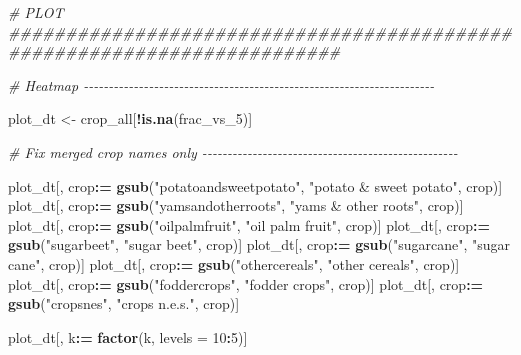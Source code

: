 \documentclass[
  11pt,
]{article}
\newenvironment{Shaded}{\begin{snugshade}}{\end{snugshade}}
\newcommand{\AttributeTok}[1]{\textcolor[rgb]{0.13,0.29,0.53}{#1}}
\newcommand{\CommentTok}[1]{\textcolor[rgb]{0.56,0.35,0.01}{\textit{#1}}}
\newcommand{\DecValTok}[1]{\textcolor[rgb]{0.00,0.00,0.81}{#1}}
\newcommand{\FunctionTok}[1]{\textcolor[rgb]{0.13,0.29,0.53}{\textbf{#1}}}
\newcommand{\NormalTok}[1]{#1}
\newcommand{\OtherTok}[1]{\textcolor[rgb]{0.56,0.35,0.01}{#1}}
\newcommand{\SpecialCharTok}[1]{\textcolor[rgb]{0.81,0.36,0.00}{\textbf{#1}}}
\newcommand{\StringTok}[1]{\textcolor[rgb]{0.31,0.60,0.02}{#1}}
\begin{document}
\begin{Shaded}
\begin{Highlighting}[]
\CommentTok{\# PLOT \#\#\#\#\#\#\#\#\#\#\#\#\#\#\#\#\#\#\#\#\#\#\#\#\#\#\#\#\#\#\#\#\#\#\#\#\#\#\#\#\#\#\#\#\#\#\#\#\#\#\#\#\#\#\#\#\#\#\#\#\#\#\#\#\#\#\#\#\#\#\#\#\#}

\CommentTok{\# Heatmap {-}{-}{-}{-}{-}{-}{-}{-}{-}{-}{-}{-}{-}{-}{-}{-}{-}{-}{-}{-}{-}{-}{-}{-}{-}{-}{-}{-}{-}{-}{-}{-}{-}{-}{-}{-}{-}{-}{-}{-}{-}{-}{-}{-}{-}{-}{-}{-}{-}{-}{-}{-}{-}{-}{-}{-}{-}{-}{-}{-}{-}{-}{-}{-}{-}{-}{-}{-}{-}{-}}

\NormalTok{plot\_dt }\OtherTok{\textless{}{-}}\NormalTok{ crop\_all[}\SpecialCharTok{!}\FunctionTok{is.na}\NormalTok{(frac\_vs\_5)]}

\CommentTok{\# Fix merged crop names only {-}{-}{-}{-}{-}{-}{-}{-}{-}{-}{-}{-}{-}{-}{-}{-}{-}{-}{-}{-}{-}{-}{-}{-}{-}{-}{-}{-}{-}{-}{-}{-}{-}{-}{-}{-}{-}{-}{-}{-}{-}{-}{-}{-}{-}{-}{-}{-}{-}{-}{-}}

\NormalTok{plot\_dt[, crop}\SpecialCharTok{:=} \FunctionTok{gsub}\NormalTok{(}\StringTok{"potatoandsweetpotato"}\NormalTok{, }\StringTok{"potato \& sweet potato"}\NormalTok{, crop)]}
\NormalTok{plot\_dt[, crop}\SpecialCharTok{:=} \FunctionTok{gsub}\NormalTok{(}\StringTok{"yamsandotherroots"}\NormalTok{, }\StringTok{"yams \& other roots"}\NormalTok{, crop)]}
\NormalTok{plot\_dt[, crop}\SpecialCharTok{:=} \FunctionTok{gsub}\NormalTok{(}\StringTok{"oilpalmfruit"}\NormalTok{, }\StringTok{"oil palm fruit"}\NormalTok{, crop)]}
\NormalTok{plot\_dt[, crop}\SpecialCharTok{:=} \FunctionTok{gsub}\NormalTok{(}\StringTok{"sugarbeet"}\NormalTok{, }\StringTok{"sugar beet"}\NormalTok{, crop)]}
\NormalTok{plot\_dt[, crop}\SpecialCharTok{:=} \FunctionTok{gsub}\NormalTok{(}\StringTok{"sugarcane"}\NormalTok{, }\StringTok{"sugar cane"}\NormalTok{, crop)]}
\NormalTok{plot\_dt[, crop}\SpecialCharTok{:=} \FunctionTok{gsub}\NormalTok{(}\StringTok{"othercereals"}\NormalTok{, }\StringTok{"other cereals"}\NormalTok{, crop)]}
\NormalTok{plot\_dt[, crop}\SpecialCharTok{:=} \FunctionTok{gsub}\NormalTok{(}\StringTok{"foddercrops"}\NormalTok{, }\StringTok{"fodder crops"}\NormalTok{, crop)]}
\NormalTok{plot\_dt[, crop}\SpecialCharTok{:=} \FunctionTok{gsub}\NormalTok{(}\StringTok{"cropsnes"}\NormalTok{, }\StringTok{"crops n.e.s."}\NormalTok{, crop)]}

\NormalTok{plot\_dt[, k}\SpecialCharTok{:=} \FunctionTok{factor}\NormalTok{(k, }\AttributeTok{levels =} \DecValTok{10}\SpecialCharTok{:}\DecValTok{5}\NormalTok{)]}


\end{Highlighting}
\end{Shaded}
\end{document}
